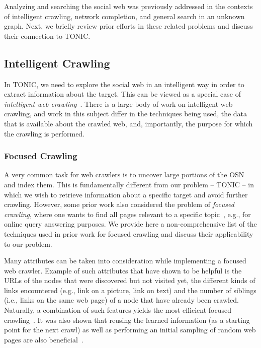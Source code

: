 \documentclass[prodmode,acmtecs]{acmsmall} %
\newcommand{\note}[2]{\textbf{\textsc{#1} says: \textit{#2}}}
\begin{document}


Analyzing and searching the social web was previously addressed in the contexts of intelligent crawling, network completion, and general search in an unknown graph. Next, we briefly review prior efforts in these related problems and discuss their connection to TONIC.


\subsection{Intelligent Crawling}
\label{sec:webCrawling}
In TONIC, we need to explore the social web in an intelligent way in order to extract information about the target. This can be viewed as a special case of {\em intelligent web crawling}~\cite{aggarwal2001intelligent,zareh2007fica,cai2008irobot}. %
There is a large body of work on intelligent web crawling, and work in this subject differ in the techniques being used, the data that is available about the crawled web, and, importantly, the purpose for which the crawling is performed. 


\subsubsection{Focused Crawling}
A very common task for web crawlers is to uncover large portions of the OSN and index them. This is fundamentally different from our problem -- TONIC -- in which we wish to retrieve information about a specific target and avoid further crawling. However, some prior work also considered the problem of {\em focused crawling}, where one wants to find  all pages relevant to a specific topic~\cite{diligenti2000focused,menczer2001evaluating}, e.g., for online query answering purposes. We provide here a non-comprehensive list of the techniques used in prior work for focused crawling and discuss their applicability to our problem. 



Many attributes can be taken into consideration while implementing a focused web crawler. Example of such attributes that have shown to be helpful is the URLs of the nodes that were discovered but not visited yet, the different kinds of links encountered (e.g., link on a picture, link on text) and the number of siblings (i.e., links on the same web page) of a node that have already been crawled. Naturally, a combination of such features yields the most efficient focused crawling~\cite{aggarwal2001intelligent}.
It was also shown that reusing the learned information (as a starting point for the next crawl) as well as performing an initial sampling of random web pages are also beneficial~\cite{cai2008irobot}.
 
\end{document}

